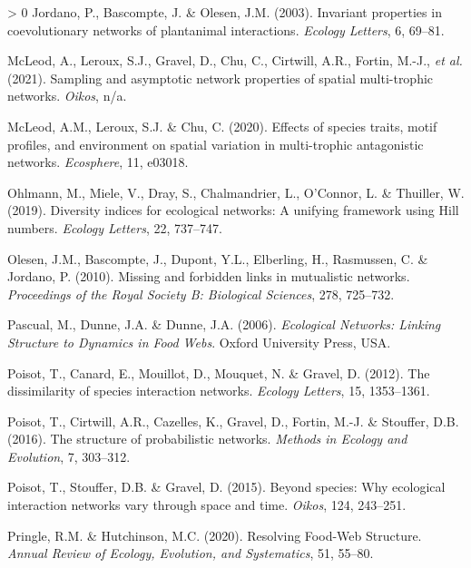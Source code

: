 \documentclass[10pt,oneside]{article}
\newlength{\cslhangindent}
\newenvironment{CSLReferences}[3] %
 {%
  \setlength{\parindent}{0pt}
  \ifodd #1 \everypar{\setlength{\hangindent}{\cslhangindent}}\ignorespaces\fi
  \ifnum #2 > 0
  \setlength{\parskip}{#2\baselineskip}
  \fi
 }%
 {}
\begin{document}
\begin{CSLReferences}{1}{0}
\leavevmode\hypertarget{ref-Jordano2003Invarianta}{}%
Jordano, P., Bascompte, J. \& Olesen, J.M. (2003). Invariant properties
in coevolutionary networks of plantanimal interactions. \emph{Ecology
Letters}, 6, 69--81.

\leavevmode\hypertarget{ref-McLeod2021Sampling}{}%
McLeod, A., Leroux, S.J., Gravel, D., Chu, C., Cirtwill, A.R., Fortin,
M.-J., \emph{et al.} (2021). Sampling and asymptotic network properties
of spatial multi-trophic networks. \emph{Oikos}, n/a.

\leavevmode\hypertarget{ref-McLeod2020EffSpe}{}%
McLeod, A.M., Leroux, S.J. \& Chu, C. (2020). Effects of species traits,
motif profiles, and environment on spatial variation in multi-trophic
antagonistic networks. \emph{Ecosphere}, 11, e03018.

\leavevmode\hypertarget{ref-Ohlmann2019Diversity}{}%
Ohlmann, M., Miele, V., Dray, S., Chalmandrier, L., O'Connor, L. \&
Thuiller, W. (2019). Diversity indices for ecological networks: A
unifying framework using Hill numbers. \emph{Ecology Letters}, 22,
737--747.

\leavevmode\hypertarget{ref-Olesen2010Missing}{}%
Olesen, J.M., Bascompte, J., Dupont, Y.L., Elberling, H., Rasmussen, C.
\& Jordano, P. (2010). Missing and forbidden links in mutualistic
networks. \emph{Proceedings of the Royal Society B: Biological
Sciences}, 278, 725--732.

\leavevmode\hypertarget{ref-Pascual2006Ecologicala}{}%
Pascual, M., Dunne, J.A. \& Dunne, J.A. (2006). \emph{Ecological
Networks: Linking Structure to Dynamics in Food Webs}. Oxford University
Press, USA.

\leavevmode\hypertarget{ref-Poisot2012Dissimilaritya}{}%
Poisot, T., Canard, E., Mouillot, D., Mouquet, N. \& Gravel, D. (2012).
The dissimilarity of species interaction networks. \emph{Ecology
Letters}, 15, 1353--1361.

\leavevmode\hypertarget{ref-Poisot2016Structure}{}%
Poisot, T., Cirtwill, A.R., Cazelles, K., Gravel, D., Fortin, M.-J. \&
Stouffer, D.B. (2016). The structure of probabilistic networks.
\emph{Methods in Ecology and Evolution}, 7, 303--312.

\leavevmode\hypertarget{ref-Poisot2015Speciesa}{}%
Poisot, T., Stouffer, D.B. \& Gravel, D. (2015). Beyond species: Why
ecological interaction networks vary through space and time.
\emph{Oikos}, 124, 243--251.

\leavevmode\hypertarget{ref-Pringle2020Resolving}{}%
Pringle, R.M. \& Hutchinson, M.C. (2020). Resolving Food-Web Structure.
\emph{Annual Review of Ecology, Evolution, and Systematics}, 51, 55--80.


\end{CSLReferences}
\end{document}
